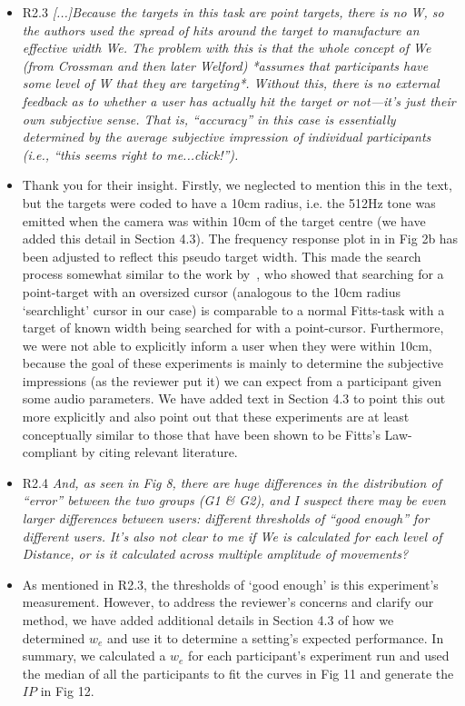 \documentclass{scrartcl}
\begin{document}
\begin{itemize}
  \item R2.3 \textit{[...]Because the targets in this task are point targets, there is no W, so the authors used the spread of hits around the target to manufacture an effective width We. The problem with this is that the whole concept of We (from Crossman and then later Welford) *assumes that participants have some level of W that they are targeting*. Without this, there is no external feedback as to whether a user has actually hit the target or not—it’s just their own subjective sense. That is, ``accuracy'' in this case is essentially determined by the average subjective impression of individual participants (i.e., ``this seems right to me...click!'').  }
  \item[] Thank you for their insight.
    Firstly, we neglected to mention this in the text, but the targets were coded to have a 10cm radius, i.e. the 512Hz tone was emitted when the camera was within 10cm of the target centre (we have added this detail in Section 4.3).
    The frequency response plot in in Fig 2b has been adjusted to reflect this pseudo target width.
    This made the search process somewhat similar to the work by~\cite{kabbash1995prince}, who showed that searching for a point-target with an oversized cursor (analogous to the 10cm radius `searchlight' cursor in our case) is comparable to a normal Fitts-task with a target of known width being searched for with a point-cursor.
    Furthermore, we were not able to explicitly inform a user when they were within 10cm, because the goal of these experiments is mainly to determine the subjective impressions (as the reviewer put it) we can expect from a participant given some audio parameters.
    We have added text in Section 4.3 to point this out more explicitly and also point out that these experiments are at least conceptually similar to those that have been shown to be Fitts's Law-compliant by citing relevant literature. 

  \item R2.4 \textit{And, as seen in Fig 8, there are huge differences in the distribution of ``error'' between the two groups (G1 \& G2), and I suspect there may be even larger differences between users: different thresholds of ``good enough'' for different users. It’s also not clear to me if We is calculated for each level of Distance, or is it calculated across multiple amplitude of movements?}
  \item[] As mentioned in R2.3, the thresholds of `good enough' is this experiment's measurement.
    However, to address the reviewer's concerns and clarify our method, we have added additional details in Section 4.3 of how we determined $w_e$ and use it to determine a setting's expected performance. 
    In summary, we calculated a $w_e$ for each participant's experiment run and used the median of all the participants to fit the curves in Fig 11 and generate the $IP$ in Fig 12. 


\end{itemize}
\end{document}
